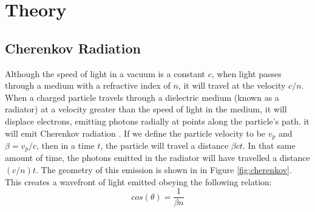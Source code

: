 
\chapter{Theory}
\label{ch:Theory}

\section{Cherenkov Radiation}
\label{sec:cherenkov}
Although the speed of light in a vacuum is a constant $c$, when light passes through a medium with a refractive index of $n$, it will travel at the velocity $c/n$.
When a charged particle travels through a dielectric medium (known as a radiator) at a velocity greater than the speed of light in the medium, it will displace electrons, emitting photons radially at points along the particle's path. it will emit Cherenkov radiation \cite{cherenkov}.
If we define the particle velocity to be $v_p$ and $\beta = v_p / c$, then in a time $t$, the particle will travel a distance $\beta ct$.
In that same amount of time, the photons emitted in the radiator will have travelled a distance $(c/n)t$.
The geometry of this emission is shown in in Figure \ref{fig:cherenkov}.
This creates a wavefront of light emitted obeying the following relation:
\begin{equation}
    cos(\theta) = \frac{1}{\beta n}
    \label{eq:cherenkovAngle}
\end{equation}

